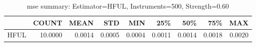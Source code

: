 \begin{table}[ht]
\centering
\caption{mse summary: Estimator=HFUL, Instruments=500, Strength=0.60}
\begin{tabular}{lrrrrrrrr}
\toprule
 & COUNT & MEAN & STD & MIN & 25\% & 50\% & 75\% & MAX \\
\midrule
HFUL & 10.0000 & 0.0014 & 0.0005 & 0.0004 & 0.0011 & 0.0014 & 0.0018 & 0.0020 \\
\bottomrule
\end{tabular}
\end{table}
